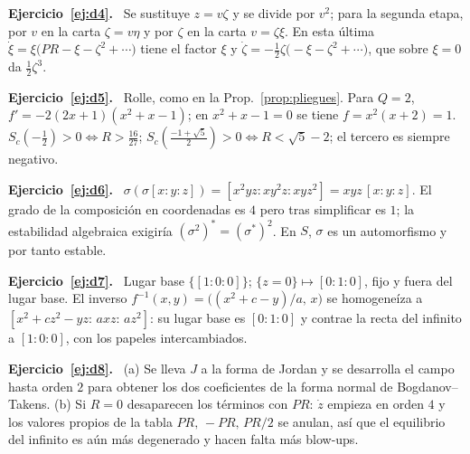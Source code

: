 \documentclass[11pt,a4paper,oneside]{book}
\theoremstyle{plain}
\theoremstyle{definition}
\theoremstyle{remark}
\newcommand{\sol}[1]{\par\medskip\noindent\textbf{Ejercicio~\ref{#1}.}\ }
\begin{document}
\sol{ej:d4} Se sustituye $z=v\zeta$ y se divide por $v^2$; para la segunda etapa, por $v$ en la carta $\zeta=v\eta$ y por $\zeta$ en la carta $v=\zeta\xi$. En esta última $\dot\xi=\xi\big(PR-\xi-\zeta^2+\cdots\big)$ tiene el factor $\xi$ y $\dot\zeta=-\tfrac12\zeta\big(-\xi-\zeta^2+\cdots\big)$, que sobre $\xi=0$ da $\tfrac12\zeta^3$.

\sol{ej:d5} Rolle, como en la Prop.~\ref{prop:pliegues}. Para $Q=2$, $f'=-2(2x+1)(x^2+x-1)$; en $x^2+x-1=0$ se tiene $f=x^2(x+2)=1$. $S_c(-\tfrac12)>0\iff R>\tfrac{16}{27}$; $S_c(\tfrac{-1+\sqrt5}2)>0\iff R<\sqrt5-2$; el tercero es siempre negativo.

\sol{ej:d6} $\sigma(\sigma[x:y:z])=[x^2yz:xy^2z:xyz^2]=xyz\,[x:y:z]$. El grado de la composición en coordenadas es $4$ pero tras simplificar es $1$; la estabilidad algebraica exigiría $(\sigma^2)^*=(\sigma^*)^2$. En $S$, $\sigma$ es un automorfismo y por tanto estable.

\sol{ej:d7} Lugar base $\{[1:0:0]\}$; $\{z=0\}\mapsto[0:1:0]$, fijo y fuera del lugar base. El inverso $f^{-1}(x,y)=\big((x^2+c-y)/a,\,x\big)$ se homogeneíza a $[x^2+cz^2-yz:\,axz:\,az^2]$: su lugar base es $[0:1:0]$ y contrae la recta del infinito a $[1:0:0]$, con los papeles intercambiados.

\sol{ej:d8} (a) Se lleva $J$ a la forma de Jordan y se desarrolla el campo hasta orden $2$ para obtener los dos coeficientes de la forma normal de Bogdanov--Takens. (b) Si $R=0$ desaparecen los términos con $PR$: $\dot z$ empieza en orden $4$ y los valores propios de la tabla $PR,\,-PR,\,PR/2$ se anulan, así que el equilibrio del infinito es aún más degenerado y hacen falta más blow-ups.
\end{document}
